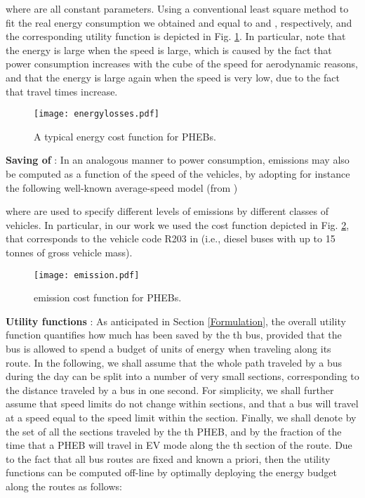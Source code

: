\documentclass[journal]{IEEEtran}
\begin{document}
where  are all constant parameters. Using a conventional least square method to fit the real energy consumption we obtained  and  equal to  and , respectively, and the corresponding utility function is depicted in Fig. \ref{energyLosses}. In particular, note that the energy is large when the speed is large, which is caused by the fact that power consumption increases with the cube of the speed for aerodynamic reasons, and that the energy is large again when the speed is very low, due to the fact that travel times increase.
\begin{figure}[htbp]
	\begin{center}
		\hspace{0.4cm}
		{\texttt{[image: energylosses.pdf]}}
		\caption{A typical energy cost function for PHEBs.}
		\label{energyLosses}
	\end{center}
\end{figure}

\textbf{Saving of }: In an analogous manner to power consumption,  emissions may also be computed as a function of the speed of the vehicles, by adopting for instance the following well-known average-speed model (from \cite{emfactor}) 

where  are used to specify different levels of emissions by different classes of vehicles. In particular, in our work we used the cost function depicted in Fig. \ref{CO2emission}, that corresponds to the vehicle code R203 in \cite{emfactor} (i.e., diesel buses with up to 15 tonnes of gross vehicle mass).
\begin{figure}[htbp]
	\begin{center}
		{\texttt{[image: emission.pdf]}}
		\caption{ emission cost function for PHEBs.}
		\label{CO2emission}
	\end{center}
\end{figure}
\newline

\textbf{Utility functions }: As anticipated in Section \ref{Formulation}, the overall utility function  quantifies how much  has been saved by the th bus, provided that the bus is allowed to spend a budget of  units of energy when traveling along its route. In the following, we shall assume that the whole path traveled by a bus during the day can be split into a number of very small sections, corresponding to the distance traveled by a bus in one second. For simplicity, we shall further assume that speed limits do not change within sections, and that a bus will travel at a speed equal to the speed limit within the section. Finally, we shall denote by  the set of all the sections traveled by the th PHEB, and by  the fraction of the time that a PHEB will travel in EV mode along the th section of the route. Due to the fact that all bus routes are fixed and known a priori, then the utility functions can be computed off-line by optimally deploying the energy budget  along the routes as follows:
 
\end{document}
